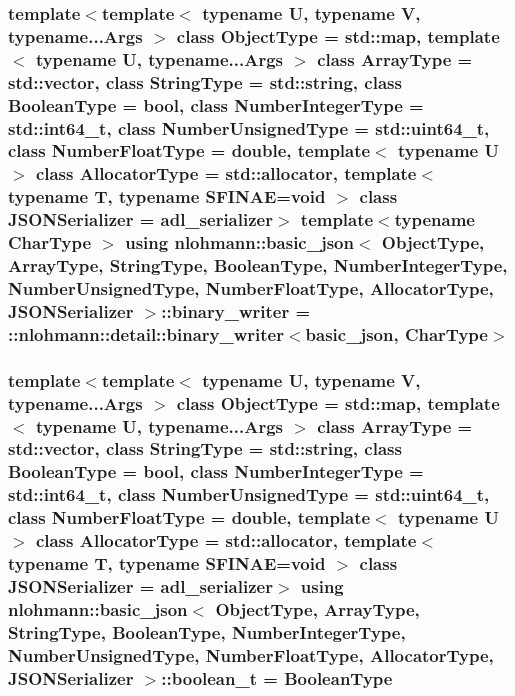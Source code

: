 \subsubsection[{\texorpdfstring{binary\+\_\+writer}{binary_writer}}]{\setlength{\rightskip}{0pt plus 5cm}template$<$template$<$ typename U, typename V, typename...\+Args $>$ class Object\+Type = std\+::map, template$<$ typename U, typename...\+Args $>$ class Array\+Type = std\+::vector, class String\+Type  = std\+::string, class Boolean\+Type  = bool, class Number\+Integer\+Type  = std\+::int64\+\_\+t, class Number\+Unsigned\+Type  = std\+::uint64\+\_\+t, class Number\+Float\+Type  = double, template$<$ typename U $>$ class Allocator\+Type = std\+::allocator, template$<$ typename T, typename S\+F\+I\+N\+A\+E=void $>$ class J\+S\+O\+N\+Serializer = adl\+\_\+serializer$>$ template$<$typename Char\+Type $>$ using {\bf nlohmann\+::basic\+\_\+json}$<$ Object\+Type, Array\+Type, String\+Type, Boolean\+Type, Number\+Integer\+Type, Number\+Unsigned\+Type, Number\+Float\+Type, Allocator\+Type, J\+S\+O\+N\+Serializer $>$\+::{\bf binary\+\_\+writer} =  \+::{\bf nlohmann\+::detail\+::binary\+\_\+writer}$<${\bf basic\+\_\+json}, Char\+Type$>$\hspace{0.3cm}{\ttfamily [private]}}\hypertarget{classnlohmann_1_1basic__json_af32e8be561b513f946e3ca511e968d58}{}\label{classnlohmann_1_1basic__json_af32e8be561b513f946e3ca511e968d58}
\subsubsection[{\texorpdfstring{boolean\+\_\+t}{boolean_t}}]{\setlength{\rightskip}{0pt plus 5cm}template$<$template$<$ typename U, typename V, typename...\+Args $>$ class Object\+Type = std\+::map, template$<$ typename U, typename...\+Args $>$ class Array\+Type = std\+::vector, class String\+Type  = std\+::string, class Boolean\+Type  = bool, class Number\+Integer\+Type  = std\+::int64\+\_\+t, class Number\+Unsigned\+Type  = std\+::uint64\+\_\+t, class Number\+Float\+Type  = double, template$<$ typename U $>$ class Allocator\+Type = std\+::allocator, template$<$ typename T, typename S\+F\+I\+N\+A\+E=void $>$ class J\+S\+O\+N\+Serializer = adl\+\_\+serializer$>$ using {\bf nlohmann\+::basic\+\_\+json}$<$ Object\+Type, Array\+Type, String\+Type, Boolean\+Type, Number\+Integer\+Type, Number\+Unsigned\+Type, Number\+Float\+Type, Allocator\+Type, J\+S\+O\+N\+Serializer $>$\+::{\bf boolean\+\_\+t} =  Boolean\+Type}\hypertarget{classnlohmann_1_1basic__json_a4c919102a9b4fe0d588af64801436082}{}\label{classnlohmann_1_1basic__json_a4c919102a9b4fe0d588af64801436082}


